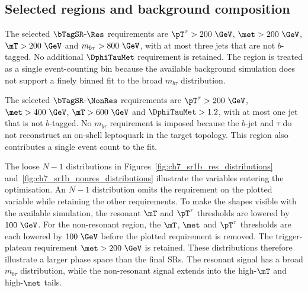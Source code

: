 \subsection{Selected regions and background composition}

The selected $\bTagSR$-$\Res$ requirements are $\pT^\tau>200~\GeV$, $\met>200~\GeV$, $\mT>200~\GeV$ and $m_{b\tau}>800~\GeV$, with at most three jets that are not $b$-tagged.
No additional $\DphiTauMet$ requirement is retained.
The region is treated as a single event-counting bin because the available background simulation does not support a finely binned fit to the broad $m_{b\tau}$ distribution.

The selected $\bTagSR$-$\NonRes$ requirements are $\pT^\tau>200~\GeV$, $\met>400~\GeV$, $\mT>600~\GeV$ and $\DphiTauMet>1.2$, with at most one jet that is not $b$-tagged.
No $m_{b\tau}$ requirement is imposed because the $b$-jet and $\tau$ do not reconstruct an on-shell leptoquark in the target topology.
This region also contributes a single event count to the fit.

The loose $N-1$ distributions in Figures~\ref{fig:ch7_sr1b_res_distributions} and~\ref{fig:ch7_sr1b_nonres_distributions} illustrate the variables entering the optimisation.
An $N-1$ distribution omits the requirement on the plotted variable while retaining the other requirements.
To make the shapes visible with the available simulation, the resonant $\mT$ and $\pT^\tau$ thresholds are lowered by $100~\GeV$.
For the non-resonant region, the $\mT$, $\met$ and $\pT^\tau$ thresholds are each lowered by $100~\GeV$ before the plotted requirement is removed.
The trigger-plateau requirement $\met>200~\GeV$ is retained.
These distributions therefore illustrate a larger phase space than the final SRs.
The resonant signal has a broad $m_{b\tau}$ distribution, while the non-resonant signal extends into the high-$\mT$ and high-$\met$ tails.

